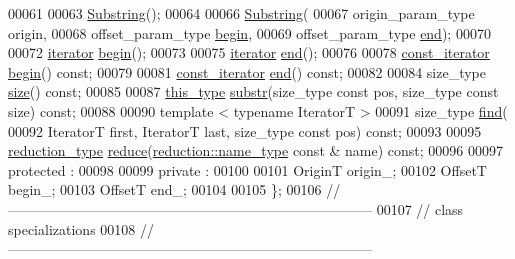 \begin{DoxyCode}
00061 
00063     \hyperlink{classhryky_1_1_substring_a6273165f234f5f2c064b8aafa495f945}{Substring}();
00064 
00066     \hyperlink{classhryky_1_1_substring_a6273165f234f5f2c064b8aafa495f945}{Substring}(
00067         origin\_param\_type origin,
00068         offset\_param\_type \hyperlink{classhryky_1_1_substring_a7d550a484228287b752fd562709b8981}{begin},
00069         offset\_param\_type \hyperlink{classhryky_1_1_substring_aa231be07658dfab51eb17900b57e4af3}{end});
00070 
00072     \hyperlink{classhryky_1_1iterator_1_1random_1_1_mutable}{iterator} \hyperlink{classhryky_1_1_substring_a7d550a484228287b752fd562709b8981}{begin}();
00073 
00075     \hyperlink{classhryky_1_1iterator_1_1random_1_1_mutable}{iterator} \hyperlink{classhryky_1_1_substring_aa231be07658dfab51eb17900b57e4af3}{end}();
00076 
00078     \hyperlink{classhryky_1_1iterator_1_1random_1_1_immutable}{const_iterator} \hyperlink{classhryky_1_1_substring_a7d550a484228287b752fd562709b8981}{begin}() \textcolor{keyword}{const};
00079 
00081     \hyperlink{classhryky_1_1iterator_1_1random_1_1_immutable}{const_iterator} \hyperlink{classhryky_1_1_substring_aa231be07658dfab51eb17900b57e4af3}{end}() \textcolor{keyword}{const};
00082 
00084     size\_type \hyperlink{classhryky_1_1_substring_a4af5f4d8501d2a5032ee6850424859ac}{size}() \textcolor{keyword}{const};
00085 
00087     \hyperlink{classhryky_1_1_substring}{this_type} \hyperlink{classhryky_1_1_substring_a55f9c969b225a603e1b4d4021ecb738b}{substr}(size\_type \textcolor{keyword}{const} pos, size\_type \textcolor{keyword}{const} size) \textcolor{keyword}{const};
00088 
00090     \textcolor{keyword}{template} < \textcolor{keyword}{typename} IteratorT >
00091     size\_type \hyperlink{classhryky_1_1_substring_a095d9b41e44fd8be92c16c7a9ab049bf}{find}(
00092         IteratorT first, IteratorT last, size\_type \textcolor{keyword}{const} pos) \textcolor{keyword}{const};
00093 
00095     \hyperlink{classhryky_1_1_intrusive_ptr}{reduction_type} \hyperlink{classhryky_1_1_substring_a816bb8132b58784093f42b812ef8f2ca}{reduce}(\hyperlink{classhryky_1_1reduction_1_1_string}{reduction::name_type} \textcolor{keyword}{const} & name) \textcolor{keyword}{const};
00096 
00097 \textcolor{keyword}{protected} :
00098 
00099 \textcolor{keyword}{private} :
00100 
00101     OriginT     origin\_;
00102     OffsetT     begin\_;
00103     OffsetT     end\_;
00104 
00105 \};
00106 \textcolor{comment}{//
      ------------------------------------------------------------------------------}
00107 \textcolor{comment}{// class specializations}
00108 \textcolor{comment}{//
      ------------------------------------------------------------------------------}

\end{DoxyCode}

